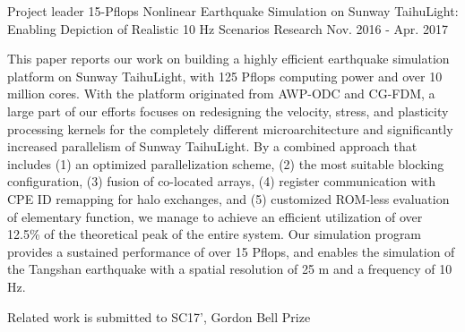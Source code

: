 \documentclass[11pt, a4paper]{awesome-cv}
\begin{document}
\begin{cventries}
  \cventry
    {Project leader} %
    {15-Pflops Nonlinear Earthquake Simulation on Sunway TaihuLight: Enabling Depiction of Realistic 10 Hz Scenarios} %
    {Research} %
    {Nov. 2016 - Apr. 2017} %
    {
      \begin{cvitems} %
        \item {This paper reports our work on building a highly efficient earthquake simulation platform on Sunway TaihuLight, with 125 Pflops computing power and over 10 million cores. With the platform originated from AWP-ODC and CG-FDM, a large part of our efforts focuses on redesigning the velocity, stress, and plasticity processing kernels for the completely different microarchitecture and significantly increased parallelism of Sunway TaihuLight. By a combined approach that includes (1) an optimized parallelization scheme, (2) the most suitable blocking configuration, (3) fusion of co-located arrays, (4) register communication with CPE ID remapping for halo exchanges, and (5) customized ROM-less evaluation of elementary function, we manage to achieve an efficient utilization of over 12.5\% of the theoretical peak of the entire system. Our simulation program provides a sustained performance of over 15 Pflops, and enables the simulation of the Tangshan earthquake with a spatial resolution of 25 m and a frequency of 10 Hz.}
       \item {Related work is submitted to SC17', Gordon Bell Prize}
      \end{cvitems}
    }
  

\end{cventries}
\end{document}
